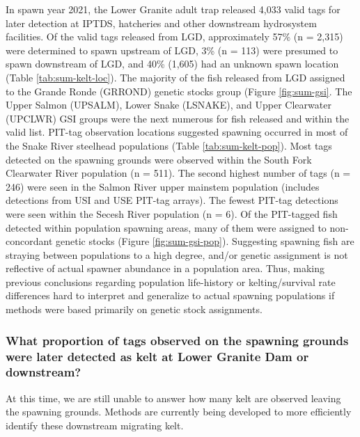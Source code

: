 \documentclass[11pt,a4paper,]{article}
\begin{document}
In spawn year 2021, the Lower Granite adult trap released 4,033 valid tags for later detection at IPTDS, hatcheries and other downstream hydrosystem facilities. Of the valid tags released from LGD, approximately 57\% (n = 2,315) were determined to spawn upstream of LGD, 3\% (n = 113) were presumed to spawn downstream of LGD, and 40\% (1,605) had an unknown spawn location (Table \ref{tab:sum-kelt-loc}). The majority of the fish released from LGD assigned to the Grande Ronde (GRROND) genetic stocks group (Figure \ref{fig:sum-gsi}. The Upper Salmon (UPSALM), Lower Snake (LSNAKE), and Upper Clearwater (UPCLWR) GSI groups were the next numerous for fish released and within the valid list. PIT-tag observation locations suggested spawning occurred in most of the Snake River steelhead populations (Table \ref{tab:sum-kelt-pop}). Most tags detected on the spawning grounds were observed within the South Fork Clearwater River population (n = 511). The second highest number of tags (n = 246) were seen in the Salmon River upper mainstem population (includes detections from USI and USE PIT-tag arrays). The fewest PIT-tag detections were seen within the Secesh River population (n = 6). Of the PIT-tagged fish detected within population spawning areas, many of them were assigned to non-concordant genetic stocks (Figure \ref{fig:sum-gsi-pop}). Suggesting spawning fish are straying between populations to a high degree, and/or genetic assignment is not reflective of actual spawner abundance in a population area. Thus, making previous conclusions regarding population life-history or kelting/survival rate differences hard to interpret and generalize to actual spawning populations if methods were based primarily on genetic stock assignments.

\hypertarget{what-proportion-of-tags-observed-on-the-spawning-grounds-were-later-detected-as-kelt-at-lower-granite-dam-or-downstream}{%
\subsubsection{What proportion of tags observed on the spawning grounds were later detected as kelt at Lower Granite Dam or downstream?}\label{what-proportion-of-tags-observed-on-the-spawning-grounds-were-later-detected-as-kelt-at-lower-granite-dam-or-downstream}}

At this time, we are still unable to answer how many kelt are observed leaving the spawning grounds. Methods are currently being developed to more efficiently identify these downstream migrating kelt.
\end{document}
